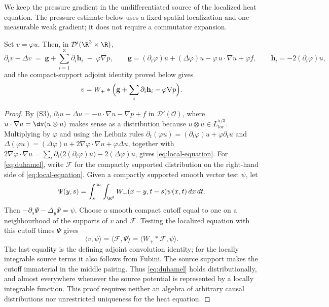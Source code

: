 \documentclass[11pt,reqno]{amsart}
\begin{document}
We keep the pressure gradient in the undifferentiated source of the
localized heat equation. The pressure estimate below uses a fixed spatial
localization and one measurable weak gradient; it does not require a
commutator expansion.

\begin{lemma}\label{lem:local-equation}
Set $v=\varphi u$. Then, in $\mathcal{D}'(\R^{3}\times\R)$,
\begin{equation}\label{eq:local-equation}
  \partial_{t}v-\Delta v
  \;=\;\mathbf{g}+\sum_{i=1}^{3}\partial_{i}\mathbf{h}_{i}
   \;-\;\varphi\nabla p,
  \qquad
  \mathbf{g}=(\partial_{t}\varphi)u+(\Delta\varphi)u-\varphi\,u\cdot\nabla u+\varphi f,
  \qquad
  \mathbf{h}_{i}=-2(\partial_{i}\varphi)u ,
\end{equation}
and the compact-support adjoint identity proved below gives
\begin{equation}\label{eq:duhamel}
  v=W_{+}*\Bigl(\mathbf{g}+\sum_{i}\partial_{i}\mathbf{h}_{i}-\varphi\nabla p\Bigr).
\end{equation}
\end{lemma}

\begin{proof}
By (S3), $\partial_{t}u-\Delta u=-u\cdot\nabla u-\nabla p+f$ in
$\mathcal{D}'(\mathcal{O})$, where $u\cdot\nabla u=\dv(u\otimes u)$ makes sense
as a distribution because $u\otimes u\in L^{5/3}_{loc}$. Multiplying by
$\varphi$ and using the Leibniz rules
$\partial_{t}(\varphi u)=(\partial_{t}\varphi)u+\varphi\partial_{t}u$ and
$\Delta(\varphi u)=(\Delta\varphi)u+2\nabla\varphi\cdot\nabla u+\varphi\Delta u$,
together with
$2\nabla\varphi\cdot\nabla u=\sum_{i}\partial_{i}\bigl(2(\partial_{i}\varphi)u\bigr)
 -2(\Delta\varphi)u$, gives \eqref{eq:local-equation}. For \eqref{eq:duhamel}, write
$\mathcal F$ for the compactly supported distribution on the right-hand
side of \eqref{eq:local-equation}. Given a compactly supported smooth
vector test $\psi$, let
\[
 \Psi(y,s)=\int_s^\infty\int_{\R^3}
                 W_+(x-y,t-s)\psi(x,t)\,dx\,dt .
\]
Then $-\partial_s\Psi-\Delta_y\Psi=\psi$.
Choose a smooth compact cutoff equal to one on a neighbourhood of the
supports of $v$ and $\mathcal F$. Testing the localized equation with
this cutoff times $\Psi$ gives
\[
 \langle v,\psi\rangle
   =\langle\mathcal F,\Psi\rangle
   =\langle W_+*\mathcal F,\psi\rangle .
\]
The last equality is the defining adjoint convolution identity; for the
locally integrable source terms it also follows from Fubini. The source
support makes the cutoff immaterial in the middle pairing. Thus
\eqref{eq:duhamel} holds distributionally, and almost everywhere whenever
the source potential is represented by a locally integrable function.
This proof requires neither an algebra of arbitrary causal distributions
nor unrestricted uniqueness for the heat equation.
\end{proof}
\end{document}
